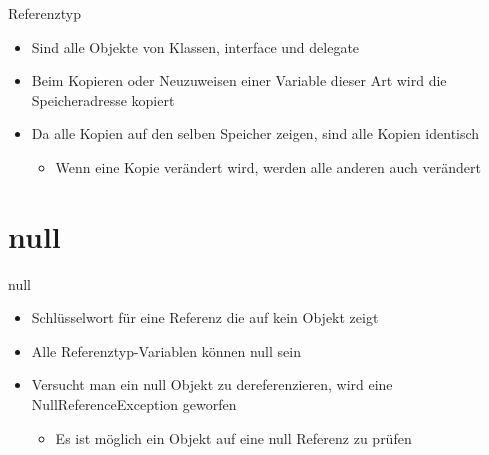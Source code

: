 \begin{frame}{Referenztyp}
	\begin{itemize}
		\item Sind alle Objekte von Klassen, \alert{interface} und \alert{delegate}
	\end{itemize}
	\begin{itemize}
		\item Beim Kopieren oder Neuzuweisen einer Variable dieser Art wird die Speicheradresse kopiert
		\item Da alle \glqq{}Kopien\grqq{} auf den selben Speicher zeigen, sind alle \glqq{}Kopien\grqq{} identisch
		\begin{itemize}
			\item Wenn eine \glqq{}Kopie\grqq{} verändert wird, werden alle anderen auch verändert
		\end{itemize}
	\end{itemize}
		
\end{frame}

\section{null}
\begin{frame}{null}
	\begin{itemize}
		\item Schlüsselwort für eine Referenz die auf kein Objekt zeigt
		\item Alle Referenztyp-Variablen können \alert{null} sein
		\item Versucht man ein \alert{null} Objekt zu dereferenzieren, wird eine \alert{NullReferenceException} geworfen 
		\begin{itemize}
			\item Es ist möglich ein Objekt auf eine \alert{null} Referenz zu prüfen
		\end{itemize}
	\end{itemize}
		
\end{frame}


